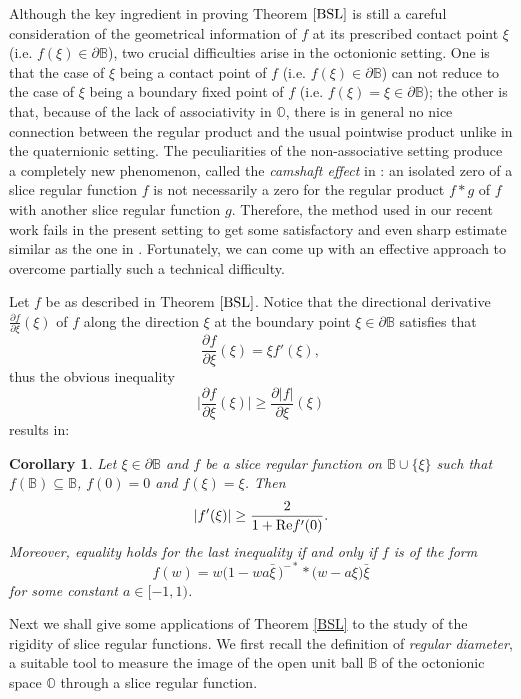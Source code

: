 \documentclass{amsart}
\newtheorem{corollary}[theorem]{Corollary}
\theoremstyle{definition}
\theoremstyle{remark}
\numberwithin{equation}{section}
\begin{document}
Although the key ingredient in proving Theorem $\ref{BSL}$ is still a careful consideration of the geometrical information of $f$ at its prescribed contact point $\xi$ (i.e. $f(\xi)\in \partial\mathbb B$), two crucial difficulties arise in the octonionic setting. One is that the case of $\xi$ being a contact point of $f$ (i.e. $f(\xi)\in\partial\mathbb B$) can not reduce to the case of $\xi$ being a boundary fixed point of $f$ (i.e. $f(\xi)=\xi\in\partial\mathbb B$); the other is that, because of the lack of associativity in  $\mathbb O$, there is in general no nice connection between the regular product and the usual pointwise product unlike in the quaternionic setting. The peculiarities of the non-associative setting produce a completely new phenomenon, called the \textit{camshaft effect} in \cite{Ghiloni2}: an isolated zero of a slice regular function $f$ is not necessarily a zero for the regular product $f\ast g$ of $f$ with another slice  regular function $g$. Therefore, the method used in our recent work \cite{WR} fails in the present setting to get some satisfactory and even sharp estimate similar as the one in \cite[Theorem 2.4, Ineq.(2.6)]{WR}. Fortunately, we can come up with an effective approach to overcome partially such a technical difficulty.

Let $f$ be as described in Theorem $\ref{BSL}$. Notice that   the directional derivative $\frac{\partial f}{\partial \xi}(\xi)$ of $f$ along the direction $\xi$  at the boundary point $\xi\in \partial\mathbb B$ satisfies that
$$\frac{\partial f}{\partial \xi}(\xi)=\xi f'(\xi),$$
thus the obvious inequality
$$\Big|\frac{\partial f}{\partial \xi}(\xi)\Big|\geq \frac{\partial |f|}{\partial \xi}(\xi)$$ results in:

\begin{corollary}
Let $\xi\in \partial\mathbb B$ and $f$ be a slice regular function on $\mathbb B\cup\{\xi\}$ such that $f(\mathbb B)\subseteq\mathbb B$, $f(0)=0$ and $f(\xi)=\xi$. Then
\begin{equation*}
|f'(\xi)|\geq\frac{2}{1+{\rm{Re}}f'(0)}.
\end{equation*}
Moreover, equality holds for the last  inequality if and only if $f$ is of the form
\begin{equation*}
f(w)=w\big(1-wa\bar{\xi}\,\big)^{-\ast}\ast\big(w-a\xi\big)\bar{\xi}
\end{equation*}
for some constant $a\in [-1,1)$.
\end{corollary}

Next we shall give some applications of Theorem \ref{BSL} to the study of the rigidity of slice regular functions. We first recall the definition of \textit{regular diameter}, a suitable tool to measure the image of the open unit ball $\mathbb B$ of the octonionic space $\mathbb O$ through a slice  regular function.
\end{document}

